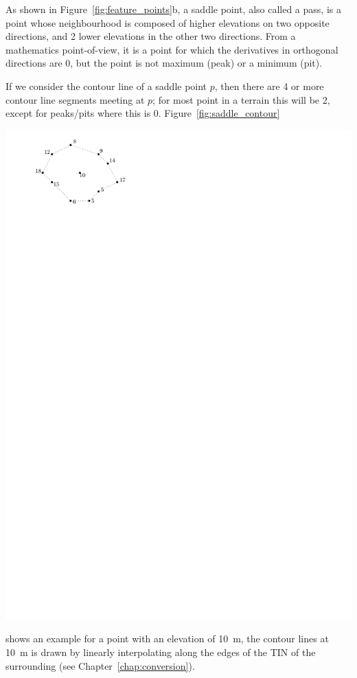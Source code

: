 As shown in Figure~\ref{fig:feature_points}b, a saddle point, also called a pass, is a point whose neighbourhood is composed of higher elevations on two opposite directions, and 2 lower elevations in the other two directions.
From a mathematics point-of-view, it is a point for which the derivatives in orthogonal directions are 0, but the point is not maximum (peak) or a minimum (pit).

%

If we consider the contour line of a saddle point $p$, then there are 4 or more contour line segments meeting at $p$; for most point in a terrain this will be 2, except for peaks/pits where this is 0.
Figure~\ref{fig:saddle_contour}
\begin{marginfigure}
  \centering
  \includegraphics[page=2,width=\textwidth]{figs/saddle_contour}
  \caption{A saddle point at elevation \SI{10}{\m}, and its surrounding points. The triangulation of the area is created and used to extract the contour line segments at \SI{10}{\m} (red lines).}%
\label{fig:saddle_contour}
\end{marginfigure}
shows an example for a point with an elevation of \SI{10}{\m}, the contour lines at \SI{10}{\m} is drawn by linearly interpolating along the edges of the TIN of the surrounding (see Chapter~\ref{chap:conversion}).


